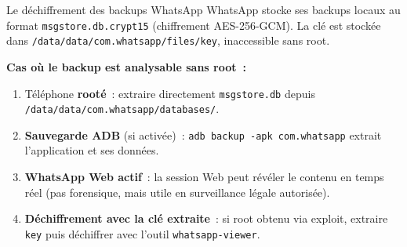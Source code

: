 \begin{boiteRemarque}{Le déchiffrement des backups WhatsApp}
WhatsApp stocke ses backups locaux au format \texttt{msgstore.db.crypt15}
(chiffrement AES-256-GCM). La clé est stockée dans
\texttt{/data/data/com.whatsapp/files/key}, inaccessible sans root.

\textbf{Cas où le backup est analysable sans root~:}
\begin{enumerate}
    \item Téléphone \textbf{rooté}~: extraire directement \texttt{msgstore.db}
          depuis \texttt{/data/data/com.whatsapp/databases/}.
    \item \textbf{Sauvegarde ADB} (si activée)~: \texttt{adb backup
          -apk com.whatsapp} extrait l'application et ses données.
    \item \textbf{WhatsApp Web actif}~: la session Web peut révéler
          le contenu en temps réel (pas forensique, mais utile en
          surveillance légale autorisée).
    \item \textbf{Déchiffrement avec la clé extraite}~: si root obtenu
          via exploit, extraire \texttt{key} puis déchiffrer avec
          l'outil \texttt{whatsapp-viewer}.
\end{enumerate}
\end{boiteRemarque}


